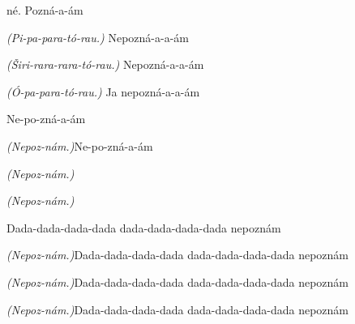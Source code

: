 \begin{song}
\bigskip

\begin{chorusboxwide}{\Refren}
né. Pozná-a-ám \par
\textit{(Pi-pa-para-}\textit{tó-rau.)} Nepozná-a-a-ám \par
\textit{(Širi-rara-rara-}\textit{tó-rau.)} Nepozná-a-a-ám \par
\textit{(Ó-pa-para-}\textit{tó-rau.)} Ja nepozná-a-a-ám \par
\end{chorusboxwide}

\bigskip

Ne-po-zná-a-ám \par
\textit{(Nepoz-}\textit{nám.)}Ne-po-zná-a-ám \par
\textit{(Nepoz-}\textit{nám.)}   \par
\textit{(Nepoz-}\textit{nám.)}   \par

\bigskip

Dada-dada-dada-dada dada-dada-dada-dada nepoznám \par
\textit{(Nepoz-}\textit{nám.)}Dada-dada-dada-dada dada-dada-dada-dada nepoznám \par
\textit{(Nepoz-}\textit{nám.)}Dada-dada-dada-dada dada-dada-dada-dada nepoznám \par
\textit{(Nepoz-}\textit{nám.)}Dada-dada-dada-dada dada-dada-dada-dada nepoznám \par

\bigskip

\Refren

\bigskip


\end{song}
